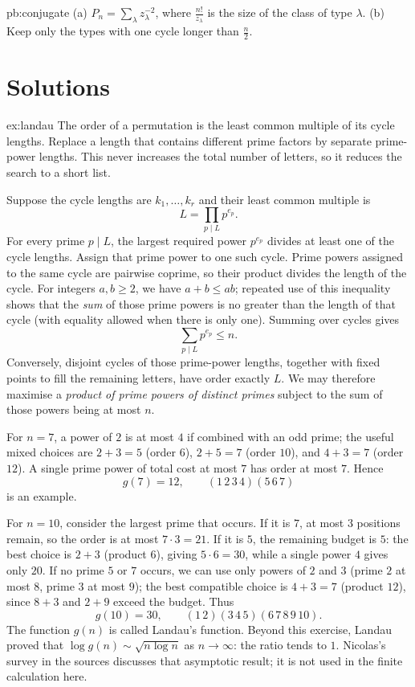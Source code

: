 \begin{hint}{pb:conjugate}
(a) $P_n=\sum_\lambda z_\lambda^{-2}$, where $\frac{n!}{z_\lambda}$ is the size of the class of type $\lambda$. (b) Keep only the
types with one cycle longer than $\frac n2$.
\end{hint}

\section{Solutions}

\begin{solution}{ex:landau}
\idea The order of a permutation is the least common multiple of its cycle lengths. Replace a length that contains different prime factors by separate prime-power lengths. This never increases the total number of letters, so it reduces the search to a short list.

\writeup Suppose the cycle lengths are $k_1,\ldots,k_r$ and their least common multiple is
\[
L=\prod_{p\mid L}p^{e_p}.
\]
For every prime $p\mid L$, the largest required power $p^{e_p}$ divides at least one of the cycle lengths. Assign that prime power to one such cycle. Prime powers assigned to the same cycle are pairwise coprime, so their product divides the length of the cycle. For integers $a,b\ge2$, we have $a+b\le ab$; repeated use of this inequality shows that the \emph{sum} of those prime powers is no greater than the length of that cycle (with equality allowed when there is only one). Summing over cycles gives
\[
\sum_{p\mid L}p^{e_p}\le n.
\]
Conversely, disjoint cycles of those prime-power lengths, together with fixed points to fill the remaining letters, have order exactly $L$. We may therefore maximise a \emph{product of prime powers of distinct primes} subject to the sum of those powers being at most $n$.

For $n=7$, a power of $2$ is at most $4$ if combined with an odd prime; the useful mixed choices are $2+3=5$ (order $6$), $2+5=7$ (order $10$), and $4+3=7$ (order $12$). A single prime power of total cost at most $7$ has order at most $7$. Hence
\[
g(7)=12,\qquad (1\,2\,3\,4)(5\,6\,7)
\]
is an example.

For $n=10$, consider the largest prime that occurs. If it is $7$, at most $3$ positions remain, so the order is at most $7\cdot3=21$. If it is $5$, the remaining budget is $5$: the best choice is $2+3$ (product $6$), giving $5\cdot6=30$, while a single power $4$ gives only $20$. If no prime $5$ or $7$ occurs, we can use only powers of $2$ and $3$ (prime $2$ at most $8$, prime $3$ at most $9$); the best compatible choice is $4+3=7$ (product $12$), since $8+3$ and $2+9$ exceed the budget. Thus
\[
g(10)=30,\qquad (1\,2)(3\,4\,5)(6\,7\,8\,9\,10).
\]
The function $g(n)$ is called Landau's function. Beyond this exercise, Landau proved that $\log g(n)\sim\sqrt{n\log n}$ as $n\to\infty$: the ratio tends to $1$. Nicolas's survey in the sources discusses that asymptotic result; it is not used in the finite calculation here.
\end{solution}


